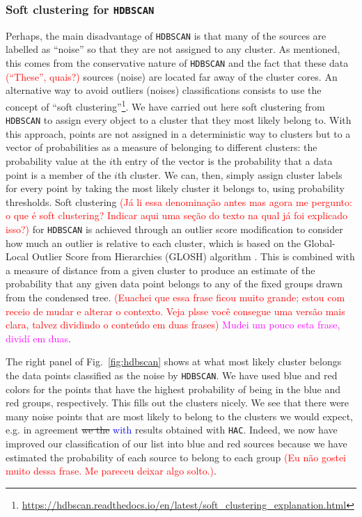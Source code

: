 \documentclass[fleqn,usenatbib]{mnras}
\newcommand{\rlopes}[1]{\textcolor{blue}{#1}}
\newcommand{\comment}[1]{\textcolor{red}{#1}}
\newcommand{\luis}[1]{\textcolor{magenta}{#1}}
\begin{document}
\subsubsection{Soft clustering for \texttt{HDBSCAN}}

Perhaps, the main disadvantage of \texttt{HDBSCAN} is that many of the sources are labelled
as ``noise''
so that they are not assigned to any cluster. As mentioned,
this comes from the conservative nature of \texttt{HDBSCAN}
and the fact that these data \comment{(``These'', quais?)} sources (noise) are located far away of the cluster cores.
An alternative 
way
to avoid 
outliers (noises) classifications consists to use the concept 
of ``soft clustering''\footnote{\url{https://hdbscan.readthedocs.io/en/latest/soft_clustering_explanation.html}}. We have carried out here soft
clustering 
from 
\texttt{HDBSCAN} to assign every object to 
a cluster that they most likely belong to.
With this approach, points are not assigned in a deterministic way to clusters 
but to a vector of probabilities as a measure of belonging to different  clusters: the probability value at the $i$th entry of the vector
is the probability that a data point is a member of the $i$th cluster. 
We can, then, simply
assign cluster labels for every point by taking the most likely cluster it belongs to,
using probability thresholds. Soft clustering
\comment{(Já li essa denominação antes mas agora me pergunto: o que é soft clustering? Indicar aqui uma seção do texto na qual já foi explicado isso?)}
for \texttt{HDBSCAN} is achieved through an outlier score modification to 
consider how much an outlier is relative to each cluster, which is based on the
Global-Local Outlier Score from Hierarchies (GLOSH) algorithm \citep{Campello:2015}.
This is combined with a measure of distance from a given cluster to produce an estimate of the probability that any given data point belongs to any of the fixed groups drawn from the condensed tree. \comment{(Euachei que essa frase ficou muito grande; estou com receio de mudar e alterar o contexto. Veja plsse você consegue uma versão mais clara, talvez dividindo o conteúdo em duas frases)} \luis{Mudei um pouco esta frase, dividí em duas}.

The right panel of Fig.~\ref{fig:hdbscan} shows at what most likely cluster belongs the data
points classified as the noise by \texttt{HDBSCAN}. We have used blue and red colors for the
points that have the highest probability of being in the blue and red groups, respectively.
This fills out the clusters nicely. We see that there were many noise points that are most
likely to belong to the clusters we would expect, e.g. in agreement 
\sout{we the} 
\rlopes{with} 
results obtained
with \texttt{HAC}. Indeed, we now have improved our classification of our list into blue and 
red sources because we have estimated the probability of each source to belong
to each group \comment{(Eu não gostei muito dessa frase. Me pareceu deixar algo solto.)}.
\end{document}
